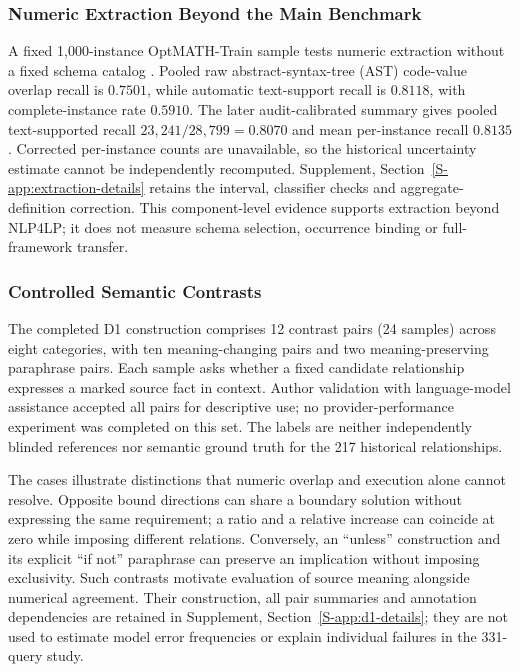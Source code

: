 \documentclass[pdflatex,sn-basic,Numbered]{sn-jnl}
\begin{document}
\subsubsection{Numeric Extraction Beyond the Main Benchmark}
\label{subsec:exp_external_validation}
A fixed 1,000-instance OptMATH-Train sample tests numeric extraction without a fixed schema catalog \cite{lu2025optmath}. Pooled raw abstract-syntax-tree (AST) code-value overlap recall is $0.7501$, while automatic text-support recall is $0.8118$, with complete-instance rate $0.5910$. The later audit-calibrated summary gives pooled text-supported recall $23{,}241/28{,}799=0.8070$ and mean per-instance recall $0.8135$. Corrected per-instance counts are unavailable, so the historical uncertainty estimate cannot be independently recomputed. Supplement, Section~\ref{S-app:extraction-details} retains the interval, classifier checks and aggregate-definition correction. This component-level evidence supports extraction beyond NLP4LP; it does not measure schema selection, occurrence binding or full-framework transfer.



\subsubsection{Controlled Semantic Contrasts}
\label{subsec:d1}
The completed D1 construction comprises 12 contrast pairs (24 samples) across eight categories, with ten meaning-changing pairs and two meaning-preserving paraphrase pairs. Each sample asks whether a fixed candidate relationship expresses a marked source fact in context. Author validation with language-model assistance accepted all pairs for descriptive use; no provider-performance experiment was completed on this set. The labels are neither independently blinded references nor semantic ground truth for the 217 historical relationships.

The cases illustrate distinctions that numeric overlap and execution alone cannot resolve. Opposite bound directions can share a boundary solution without expressing the same requirement; a ratio and a relative increase can coincide at zero while imposing different relations. Conversely, an ``unless'' construction and its explicit ``if not'' paraphrase can preserve an implication without imposing exclusivity. Such contrasts motivate evaluation of source meaning alongside numerical agreement. Their construction, all pair summaries and annotation dependencies are retained in Supplement, Section~\ref{S-app:d1-details}; they are not used to estimate model error frequencies or explain individual failures in the 331-query study.
\end{document}
